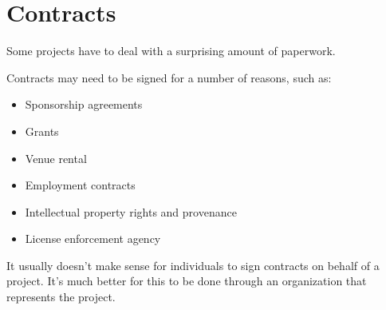 


\chapter{Contracts}

Some projects have to deal with a surprising amount of paperwork.

Contracts may need to be signed for a number of reasons, such as:

\begin{itemize}

\item Sponsorship agreements

\item Grants

\item Venue rental

\item Employment contracts

\item Intellectual property rights and provenance

\item License enforcement agency

\end{itemize}

It usually doesn't make sense for individuals to sign contracts on behalf of a project.  It's much better for this to be done through an organization that represents the project.

